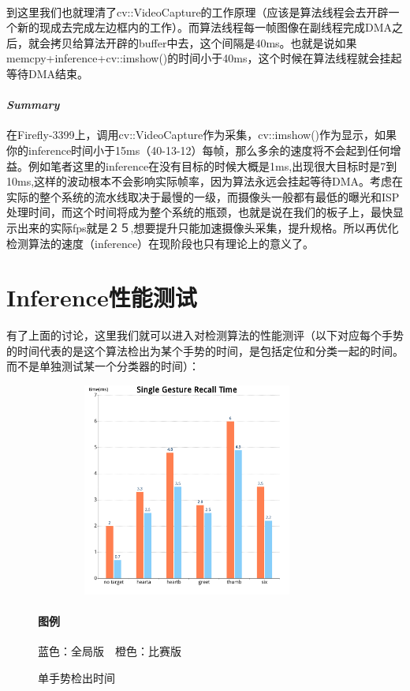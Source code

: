 \documentclass{article}
\begin{document}
\paragraph{}到这里我们也就理清了cv::VideoCapture的工作原理（应该是算法线程会去开辟一个新的现成去完成左边框内的工作）。而算法线程每一帧图像在副线程完成DMA之后，就会拷贝给算法开辟的buffer中去，这个间隔是40ms。也就是说如果memcpy+inference+cv::imshow()的时间小于40ms，这个时候在算法线程就会挂起等待DMA结束。


\paragraph{\emph{Summary}}在Firefly-3399上，调用cv::VideoCapture作为采集，cv::imshow()作为显示，如果你的inference时间小于15ms（40-13-12）每帧，那么多余的速度将不会起到任何增益。例如笔者这里的inference在没有目标的时候大概是1ms,出现很大目标时是7到10ms,这样的波动根本不会影响实际帧率，因为算法永远会挂起等待DMA。考虑在实际的整个系统的流水线取决于最慢的一级，而摄像头一般都有最低的曝光和ISP处理时间，而这个时间将成为整个系统的瓶颈，也就是说在我们的板子上，最快显示出来的实际fps就是２５,想要提升只能加速摄像头采集，提升规格。所以再优化检测算法的速度（inference）在现阶段也只有理论上的意义了。

\section{Inference性能测试}有了上面的讨论，这里我们就可以进入对检测算法的性能测评（以下对应每个手势的时间代表的是这个算法检出为某个手势的时间，是包括定位和分类一起的时间。而不是单独测试某一个分类器的时间）：
	\begin{figure}[H]

	\centering
	\includegraphics[width=10cm,height=7cm]{pic/single.png}
	\caption{单手势检出时间}
	\label{fig:label}
	\paragraph{图例}蓝色：全局版　橙色：比赛版
	\end{figure}
		
\end{document}
